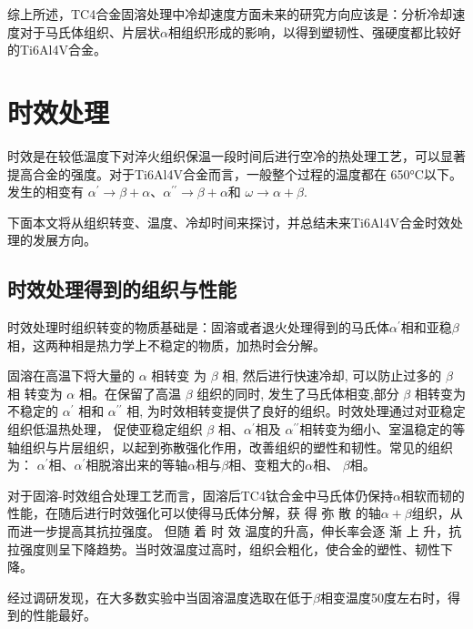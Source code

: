 \documentclass[
class = book,
zihao = -4,
font = noto,
paper = a4paper,
openany
]{easybook}
\newcommand{\ti}{Ti6Al4V}
\begin{document}
综上所述，TC4合金固溶处理中冷却速度方面未来的研究方向应该是：分析冷却速度对于马氏体组织、片层状$ \alpha $相组织形成的影响，以得到塑韧性、强硬度都比较好的\ti 合金。
\chapter{时效处理}
时效是在较低温度下对淬火组织保温一段时间后进行空冷的热处理工艺，可以显著提高合金的强度。对于\ti 合金而言，一般整个过程的温度都在 650°C以下。发生的相变有 $ \alpha  ^{\prime}\to \beta+\alpha$、$ \alpha  ^{\prime\prime}\to\beta+\alpha$和 $\omega\to \alpha+\beta$.

下面本文将从组织转变、温度、冷却时间来探讨，并总结未来\ti 合金时效处理的发展方向。
\section{时效处理得到的组织与性能}
时效处理时组织转变的物质基础是：固溶或者退火处理得到的马氏体$ \alpha^{\prime} $相和亚稳$ \beta $相，这两种相是热力学上不稳定的物质，加热时会分解。

固溶在高温下将大量的 $\alpha$ 相转变 为 $\beta$ 相, 然后进行快速冷却, 可以防止过多的 $\beta$ 相 转变为 $\alpha$ 相。在保留了高温 $\beta$ 组织的同时, 发生了马氏体相变,部分 $\beta$ 相转变为不稳定的 $\alpha^{\prime}$ 相和 $\alpha^{\prime \prime}$ 相, 为时效相转变提供了良好的组织\cite{ xinsheweiGuanyutaihejinrechulihexichuxiangdetaolun2006,zouhaibeiTC4taihejinrechuliqianghuagongyijixiangbianhangweiyanjiu2019a}。时效处理通过对亚稳定组织低温热处理， 促使亚稳定组织 $\beta$ 相、$ \alpha  ^{\prime}$相及 $ \alpha  ^{\prime\prime}$相转变为细小、室温稳定的等轴组织与片层组织，以起到弥散强化作用，改善组织的塑性和韧性。常见的组织为\cite{zhanghaoyinGurongShixiaoduiTC4taihejinzuzhihelixuexingnengdeyingxiang2014}： $ \alpha  ^{\prime}$相、$ \alpha  ^{\prime}$相脱溶出来的等轴$ \alpha$相与$ \beta $相、变粗大的$ \alpha $相、 $ \beta $相。

对于固溶-时效组合处理工艺而言，固溶后TC4钛合金中马氏体仍保持$ \alpha $相软而韧的性能，在随后进行时效强化可以使得马氏体分解，获 得 弥 散 的轴$ \alpha+\beta $组织，从而进一步提高其抗拉强度。 但随 着 时 效 温度的升高，伸长率会逐 渐 上 升，抗拉强度则呈下降趋势。当时效温度过高时，组织会粗化，使合金的塑性、韧性下降\cite{guxiaohuiCuihuoShixiaowenduduiTC4taihejinzuzhihelixuexingnengdeyingxiang2011}。



经过调研发现，在大多数实验中当固溶温度选取在低于$ \beta $相变温度50度左右时，得到的性能最好。
\end{document}
